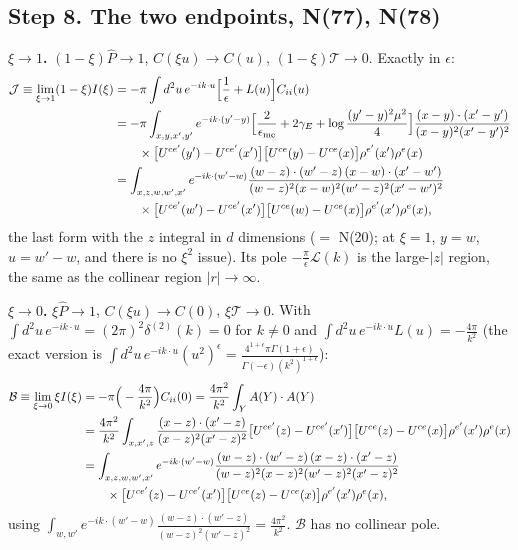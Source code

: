 \documentclass[10pt]{article}
\numberwithin{equation}{section}
\newcommand{\Wop}[2]{\big[U^{ce'}(#2)-U^{ce'}(x')\big]\big[U^{ce}(#1)-U^{ce}(x)\big]\rho^{e'}(x')\rho^{e}(x)}
\newcommand{\Kx}[2]{\frac{(x-#1)\cdot(x'-#2)}{(x-#1)^{2}(x'-#2)^{2}}}
\newcommand{\Ph}{\hat P}
\newcommand{\Lc}{\mathcal L}
\newcommand{\Jc}{\mathcal J}
\newcommand{\Bc}{\mathcal B}
\newcommand{\Tc}{\mathcal T}
\begin{document}
\subsection*{Step 8. The two endpoints, N(77), N(78)}
\textbf{$\xi\to1$.} $(1-\xi)\Ph\to1$, $C(\xi u)\to C(u)$, $(1-\xi)\Tc\to0$. Exactly in $\epsilon$:
\begin{align}
\Jc\equiv\lim_{\xi\to1}(1-\xi)I(\xi)&=-\pi\int d^2u\,e^{-ik\cdot u}\Big[\frac1\epsilon+L(u)\Big]C_{ii}(u)\notag\\
&=-\pi\int_{x,y,x',y'}e^{-ik\cdot(y'-y)}\Big[\frac{2}{\epsilon_{\rm me}}+2\gamma_E+\log\frac{(y'-y)^2\mu^2}{4}\Big]\Kx{y}{y'}\notag\\
&\qquad\times\Wop{y}{y'}\notag\\
&=\int_{x,z,w,w',x'}e^{-ik\cdot(w'-w)}\frac{(w-z)\cdot(w'-z)\,(x-w)\cdot(x'-w')}{(w-z)^2(x-w)^2(w'-z)^2(x'-w')^2}\notag\\
&\qquad\times\Wop{w}{w'},
\end{align}
the last form with the $z$ integral in $d$ dimensions ($=$ N(20); at $\xi=1$, $y=w$, $u=w'-w$, and there is no
$\xi^2$ issue). Its pole $-\frac\pi\epsilon\Lc(k)$ is the large-$|z|$ region, the same as the collinear region
$|r|\to\infty$.

\textbf{$\xi\to0$.} $\xi\Ph\to1$, $C(\xi u)\to C(0)$, $\xi\Tc\to0$. With $\int d^2u\,e^{-ik\cdot u}=(2\pi)^2\delta^{(2)}(k)=0$
for $k\neq0$ and $\int d^2u\,e^{-ik\cdot u}L(u)=-\frac{4\pi}{k^2}$ (the exact version is
$\int d^2u\,e^{-ik\cdot u}(u^2)^\epsilon=\frac{4^{1+\epsilon}\pi\Gamma(1+\epsilon)}{\Gamma(-\epsilon)(k^2)^{1+\epsilon}}$):
\begin{align}
\Bc\equiv\lim_{\xi\to0}\xi I(\xi)&=-\pi\Big(-\frac{4\pi}{k^2}\Big)C_{ii}(0)=\frac{4\pi^2}{k^2}\int_YA(Y)\cdot A(Y)\notag\\
&=\frac{4\pi^2}{k^2}\int_{x,x',z}\Kx{z}{z}\Wop{z}{z}\notag\\
&=\int_{x,z,w,w',x'}e^{-ik\cdot(w'-w)}\frac{(w-z)\cdot(w'-z)\,(x-z)\cdot(x'-z)}{(w-z)^2(x-z)^2(w'-z)^2(x'-z)^2}\notag\\
&\qquad\times\Wop{z}{z},
\end{align}
using $\int_{w,w'}e^{-ik\cdot(w'-w)}\frac{(w-z)\cdot(w'-z)}{(w-z)^2(w'-z)^2}=\frac{4\pi^2}{k^2}$. $\Bc$ has no collinear pole.
\end{document}
